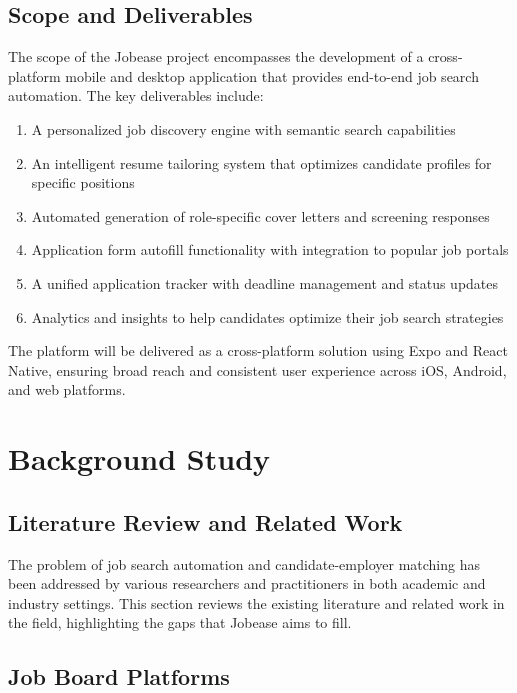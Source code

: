 \documentclass[12pt,a4paper]{report}
\begin{document}
\section*{Scope and Deliverables}

The scope of the Jobease project encompasses the development of a cross-platform mobile and desktop application that provides end-to-end job search automation. The key deliverables include:

\begin{enumerate}
    \item A personalized job discovery engine with semantic search capabilities
    \item An intelligent resume tailoring system that optimizes candidate profiles for specific positions
    \item Automated generation of role-specific cover letters and screening responses
    \item Application form autofill functionality with integration to popular job portals
    \item A unified application tracker with deadline management and status updates
    \item Analytics and insights to help candidates optimize their job search strategies
\end{enumerate}

The platform will be delivered as a cross-platform solution using Expo and React Native, ensuring broad reach and consistent user experience across iOS, Android, and web platforms.

\chapter{Background Study}

\section*{Literature Review and Related Work}

The problem of job search automation and candidate-employer matching has been addressed by various researchers and practitioners in both academic and industry settings. This section reviews the existing literature and related work in the field, highlighting the gaps that Jobease aims to fill.

\section*{Job Board Platforms}
\end{document}
